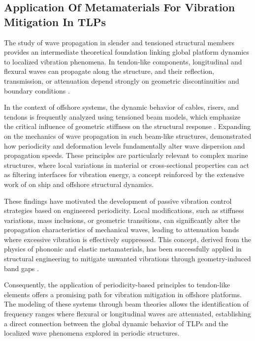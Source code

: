 \subsection{Application Of Metamaterials For Vibration Mitigation In TLPs}

The study of wave propagation in slender and tensioned structural members provides an intermediate theoretical foundation linking global platform dynamics to localized vibration phenomena. In tendon-like components, longitudinal and flexural waves can propagate along the structure, and their reflection, transmission, or attenuation depend strongly on geometric discontinuities and boundary conditions \cite{rao2007,meirovitch2001}.

In the context of offshore systems, the dynamic behavior of cables, risers, and tendons is frequently analyzed using tensioned beam models, which emphasize the critical influence of geometric stiffness on the structural response \cite{Adrezin1999}. Expanding on the mechanics of wave propagation in such beam-like structures, \textcite{Maurin2016} demonstrated how periodicity and deformation levels fundamentally alter wave dispersion and propagation speeds. These principles are particularly relevant to complex marine structures, where local variations in material or cross-sectional properties can act as filtering interfaces for vibration energy, a concept reinforced by the extensive work of \textcite{Senjanovic2010} on ship and offshore structural dynamics.

These findings have motivated the development of passive vibration control strategies based on engineered periodicity. Local modifications, such as stiffness variations, mass inclusions, or geometric transitions, can significantly alter the propagation characteristics of mechanical waves, leading to attenuation bands where excessive vibration is effectively suppressed. This concept, derived from the physics of phononic and elastic metamaterials, has been successfully applied in structural engineering to mitigate unwanted vibrations through geometry-induced band gaps \cite{hussein2014,MirandaJr2017}. 

Consequently, the application of periodicity-based principles to tendon-like elements offers a promising path for vibration mitigation in offshore platforms. The modeling of these systems through beam theories allows the identification of frequency ranges where flexural or longitudinal waves are attenuated, establishing a direct connection between the global dynamic behavior of TLPs and the localized wave phenomena explored in periodic structures.

